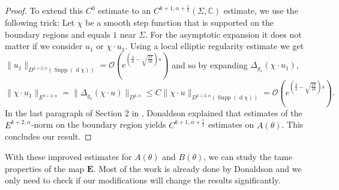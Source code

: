 \documentclass[preprint,12pt]{elsarticle}
\numberwithin{table}{section}
\newcommand{\C}{\mathbb{C}}
\renewcommand{\d}{\operatorname{d}\!}
\renewcommand{\O}{\mathcal{O}}
\begin{document}
\begin{proof}
	To extend this $C^0$ estimate to an $C^{k+1, \alpha + \frac{1}{2}}(\Sigma, \C)$ estimate, we use the following trick: Let $\chi$ be a smooth step function that is supported on the boundary regions and equals $1$ near $\Sigma$.
	For the asymptotic expansion it does not matter if we consider $u_1$ or $\chi \cdot u_1$. Using a local elliptic regularity estimate we get 
	$
	\|u_1 \|_{D^{k+2, \alpha}(\operatorname{Supp}(\d \chi))} = \O\left(e^{(\frac{3}{4} - \sqrt{\frac{17}{16}})s}\right)
	$ and so by expanding $\Delta_{g_s}(\chi \cdot u_1)$,
	$$
	\| \chi \cdot u_1 \|_{E^{k+2, \alpha}} 
	= \|\Delta_{g_s} (\chi \cdot u) \|_{D^{k, \alpha}}
	\le C \|\chi \cdot u \|_{D^{k+2, \alpha}(\operatorname{Supp}(\d \chi))} = \O\left(e^{(\frac{3}{4} - \sqrt{\frac{17}{16}})s}\right).
	$$
	In the last paragraph of Section 2 in \cite{Donaldson2021}, Donaldson explained that estimates of the $E^{k+2, \alpha}$-norm on the boundary region yields $C^{k+1, \alpha + \frac{1}{2}}$ estimates on $A(\theta)$. This concludes our result.	
\end{proof}

With these improved estimates for $A(\theta)$ and $B(\theta)$, we can study the tame properties of the map $\mathbf{E}$. Most of the work is already done by Donaldson and we only need to check if our modifications will change the results significantly.
\end{document}
